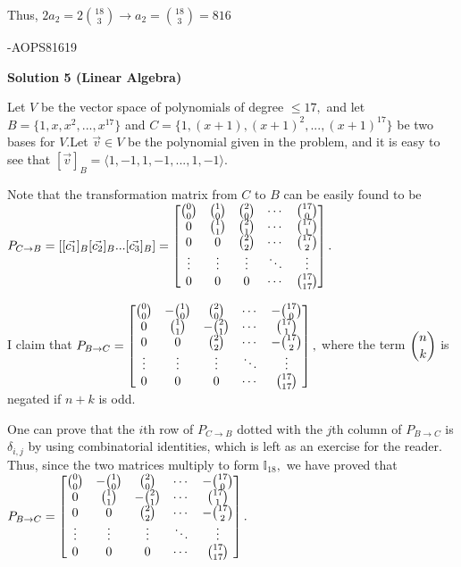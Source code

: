 \begin{enumerate}
 Thus, $2a_2 = 2\binom{18}{3}\rightarrow a_2 = \binom{18}{3}=\boxed{816}$

 -AOPS81619

 



\textbf{Solution 5 (Linear Algebra)}

Let $V$ be the vector space of polynomials of degree $\leq 17,$ and let $B = \{1, x, x^2, ..., x^{17} \}$ and $C = \{1, (x+1), (x+1)^2, ..., (x+1)^{17} \}$ be two bases for $V$.Let $\vec{v} \in V$ be the polynomial given in the problem, and it is easy to see that $[ \vec{v} ]_B = \langle 1, -1, 1, -1, ... , 1, -1 \rangle.$

 Note that the transformation matrix from $C$ to $B$ can be easily found to be $P_{C \to B} = [ [\vec{c_1}]_B [\vec{c_2}]_B ... [\vec{c_3}]_B ] = \begin{bmatrix} \tbinom{0}{0} & \tbinom{1}{0} & \tbinom{2}{0} & \cdots & \tbinom{17}{0} \\ 0 & \tbinom{1}{1} & \tbinom{2}{1} & \cdots & \tbinom{17}{1} \\ 0 & 0 & \tbinom{2}{2} & \cdots & \tbinom{17}{2} \\ \vdots & \vdots & \vdots & \ddots & \vdots \\ 0 & 0 & 0 & \cdots & \tbinom{17}{17} \end{bmatrix} .$

 I claim that $P_{B \to C} = \begin{bmatrix} \tbinom{0}{0} & -\tbinom{1}{0} & \tbinom{2}{0} & \cdots & -\tbinom{17}{0} \\ 0 & \tbinom{1}{1} & -\tbinom{2}{1} & \cdots & \tbinom{17}{1} \\ 0 & 0 & \tbinom{2}{2} & \cdots & -\tbinom{17}{2} \\ \vdots & \vdots & \vdots & \ddots & \vdots \\ 0 & 0 & 0 & \cdots & \tbinom{17}{17} \end{bmatrix} ,$ where the term $\dbinom{n}{k}$ is negated if $n+k$ is odd. 

 One can prove that the $i$th row of $P_{C \to B}$ dotted with the $j$th column of $P_{B \to C}$ is $\delta_{i, j}$ by using combinatorial identities, which is left as an exercise for the reader. Thus, since the two matrices multiply to form $\mathbb{I}_{18},$ we have proved that $P_{B \to C} = \begin{bmatrix} \tbinom{0}{0} & -\tbinom{1}{0} & \tbinom{2}{0} & \cdots & -\tbinom{17}{0} \\ 0 & \tbinom{1}{1} & -\tbinom{2}{1} & \cdots & \tbinom{17}{1} \\ 0 & 0 & \tbinom{2}{2} & \cdots & -\tbinom{17}{2} \\ \vdots & \vdots & \vdots & \ddots & \vdots \\ 0 & 0 & 0 & \cdots & \tbinom{17}{17} \end{bmatrix} .$


\end{enumerate}
